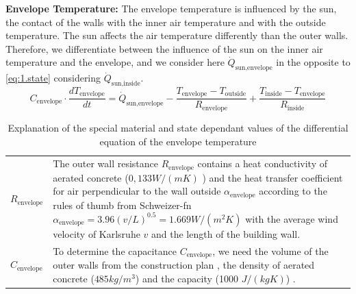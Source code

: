     \textbf{Envelope Temperature:}\newline
    The envelope temperature is influenced by the sun, the contact of the walls with the inner air temperature and with the outside temperature. The sun affects the air temperature differently than the outer walls. Therefore, we differentiate between the influence of the sun on the inner air temperature and the envelope, and we consider here $\dot{Q}_\text{sun,envelope}$ in the opposite to \autoref{eq:1.state} considering $\dot{Q}_\text{sun,inside}$.
    \begin{equation}
    \label{eq:diffEnvelope}
        C_\text{envelope}\cdot \frac{d T_\text{envelope}}{d t} = \dot{Q}_\text{sun,envelope} - \frac{T_\text{envelope}-T_\text{outside}}{R_\text{envelope}} + \frac{T_\text{inside}-T_\text{envelope}}{R_\text{inside}}
    \end{equation}
    \begin{table}[H]
        \centering
        \begin{tabular}{l p{13cm}}
        $R_\text{envelope}$ & The outer wall resistance $R_\text{envelope}$ contains a heat conductivity of aerated concrete ($0,133 W/(m K)$ \cite{GhaziWakili.2015}) and the heat transfer coefficient for air perpendicular to the wall outside $\alpha_\text{envelope}$ according to the rules of thumb from Schweizer-fn $\alpha_\text{envelope} = 3.96 (v / L)^{0.5} = 1.669 W/(m^2 K)$ \cite{Schweizer-fnalpha} with the average wind velocity of Karlsruhe $v$ \cite{AbteilungKlimaundUmweltberatung.2004} and the length of the building wall.\\
        $C_\text{envelope}$ & To determine the capacitance $C_\text{envelope}$, we need the volume of the outer walls from the construction plan \cite{Bauplan}, the density of aerated concrete ($485 kg/m^3$) and the capacity (1000 $J/(kg K)$) \cite{GhaziWakili.2015}. 
        \end{tabular}
        \caption{Explanation of the special material and state dependant values of the differential equation of the envelope temperature}
        \label{tab:valuesOfEnvelopeTemperature}
    \end{table}
   
